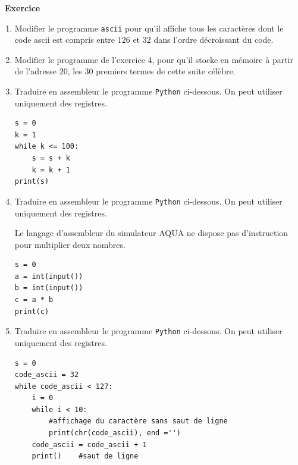 \documentclass[a4paper, french, 11pt]{article}  %
\newcounter{exercice}
\newenvironment{exercice}[1]
{\par \medskip   \addtocounter{exercice}{1} \noindent  
\begin{bclogo}[arrondi =0.1,   noborder = true, logo=\bccrayon, marge=4]{~\textbf{Exercice} \textbf{\theexercice} {\itshape #1} }  \par}
{
\end{bclogo}
 \par \bigskip }
\newcounter{prog}
\begin{document}
\begin{exercice}{}

\begin{enumerate}
	\item Modifier le programme \texttt{ascii} pour qu'il affiche tous les caractères dont le code ascii est compris entre $126$ et $32$ dans l'ordre décroissant du code.
	
	\item Modifier le programme de l'exercice 4, pour qu'il stocke en mémoire à partir de l'adresse $20$, les $30$ premiers termes de cette suite célèbre.
	
	\item Traduire en assembleur le programme \texttt{Python} ci-dessous. On peut utiliser uniquement des registres.
	
\begin{lstlisting}[style=rond]
s = 0
k = 1
while k <= 100:
	s = s + k
	k = k + 1
print(s)
\end{lstlisting}

	\item Traduire en assembleur le programme \texttt{Python} ci-dessous. On peut utiliser uniquement des registres.

\bcattention{} Le langage d'assembleur du simulateur AQUA ne dispose pas d'instruction pour multiplier deux nombres.

 
\begin{lstlisting}[style=rond]s = 0
a = int(input())
b = int(input())
c = a * b
print(c)
\end{lstlisting}


\item Traduire en assembleur le programme \texttt{Python} ci-dessous. On peut utiliser uniquement des registres.

\begin{lstlisting}[style=rond]s = 0
code_ascii = 32
while code_ascii < 127:
	i = 0
	while i < 10:
		#affichage du caractère sans saut de ligne
		print(chr(code_ascii), end ='') 
    code_ascii = code_ascii + 1
	print()    #saut de ligne
\end{lstlisting}

\end{enumerate}

\end{exercice}

 
\end{document}
